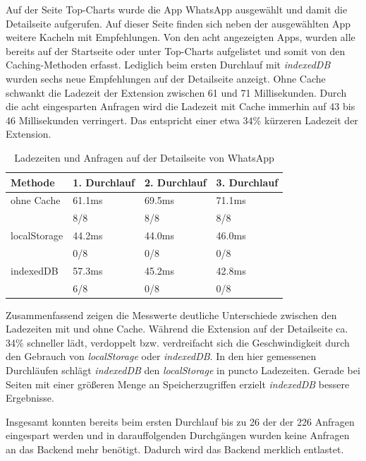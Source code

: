 Auf der Seite \glqq Top-Charts \grqq{} wurde die App \glqq WhatsApp \grqq{} ausgewählt und damit die Detailseite aufgerufen. Auf dieser Seite finden sich neben der ausgewählten App weitere Kacheln mit Empfehlungen. Von den acht angezeigten Apps, wurden alle bereits auf der Startseite oder unter \glqq Top-Charts \grqq{} aufgelistet und somit von den Caching-Methoden erfasst. Lediglich beim ersten Durchlauf mit \textit{indexedDB} wurden sechs neue Empfehlungen auf der Detailseite anzeigt. Ohne Cache schwankt die Ladezeit der Extension zwischen 61 und 71 Millisekunden. Durch die acht eingesparten Anfragen wird die Ladezeit mit Cache immerhin auf 43 bis 46 Millisekunden verringert. Das entspricht einer etwa 34\% kürzeren Ladezeit der Extension.
\begin{table}[h]
	\begin{tabular}{p{2.8cm}C{3.0cm}C{2.8cm}C{3.0cm}}
		\toprule
		\textbf{Methode}	&	\textbf{1. Durchlauf}	&	\textbf{2. Durchlauf}	& \textbf{3. Durchlauf}\\
		\midrule
		ohne Cache	&	61.1ms	&	69.5ms	&	71.1ms	\\
		&	8/8	&	8/8	&	8/8	\\
		
		localStorage	&	44.2ms	&	44.0ms	&	46.0ms	\\
		&	0/8		&	0/8	&	0/8	\\
		
		indexedDB	&	57.3ms	&	45.2ms	&	42.8ms	\\
		&	6/8	&	0/8	&	0/8	\\
		
		\bottomrule
	\end{tabular}
	\caption{Ladezeiten und Anfragen auf der Detailseite von \glqq WhatsApp \grqq{}}
	\label{ergebnis33}
\end{table}

Zusammenfassend zeigen die Messwerte deutliche Unterschiede zwischen den Ladezeiten mit und ohne Cache. Während die Extension auf der Detailseite ca. 34\% schneller lädt, verdoppelt bzw. verdreifacht sich die Geschwindigkeit durch den Gebrauch von \textit{localStorage} oder \textit{indexedDB}. In den hier gemessenen Durchläufen schlägt \textit{indexedDB} den \textit{localStorage} in puncto Ladezeiten. Gerade bei Seiten mit einer größeren Menge an Speicherzugriffen erzielt \textit{indexedDB} bessere Ergebnisse.

Insgesamt konnten bereits beim ersten Durchlauf bis zu 26 der der 226 Anfragen eingespart werden und in darauffolgenden Durchgängen wurden keine Anfragen an das Backend mehr benötigt. Dadurch wird das Backend merklich entlastet.

